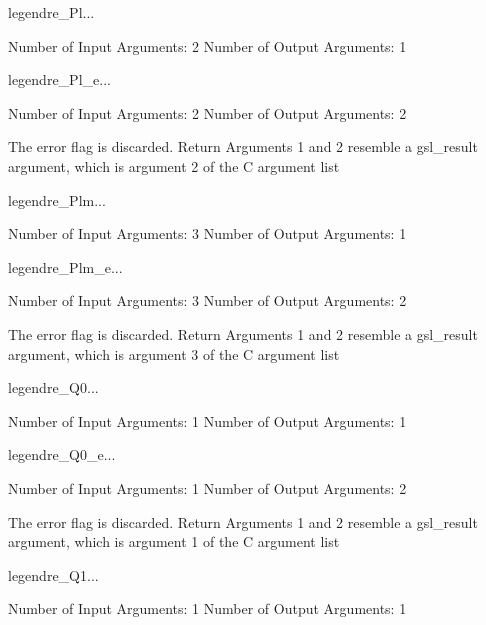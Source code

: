 \begin{funcdesc}{legendre_Pl}{...}

    Number of Input  Arguments:  2
    Number of Output Arguments:  1
\end{funcdesc}

\begin{funcdesc}{legendre_Pl_e}{...}

    Number of Input  Arguments:  2
    Number of Output Arguments:  2

The error flag is discarded.
Return Arguments 1 and 2 resemble a gsl_result argument,
	which is  argument 2 of the C argument list

\end{funcdesc}

\begin{funcdesc}{legendre_Plm}{...}

    Number of Input  Arguments:  3
    Number of Output Arguments:  1
\end{funcdesc}

\begin{funcdesc}{legendre_Plm_e}{...}

    Number of Input  Arguments:  3
    Number of Output Arguments:  2

The error flag is discarded.
Return Arguments 1 and 2 resemble a gsl_result argument,
	which is  argument 3 of the C argument list

\end{funcdesc}

\begin{funcdesc}{legendre_Q0}{...}

    Number of Input  Arguments:  1
    Number of Output Arguments:  1
\end{funcdesc}

\begin{funcdesc}{legendre_Q0_e}{...}

    Number of Input  Arguments:  1
    Number of Output Arguments:  2

The error flag is discarded.
Return Arguments 1 and 2 resemble a gsl_result argument,
	which is  argument 1 of the C argument list

\end{funcdesc}

\begin{funcdesc}{legendre_Q1}{...}

    Number of Input  Arguments:  1
    Number of Output Arguments:  1
\end{funcdesc}

